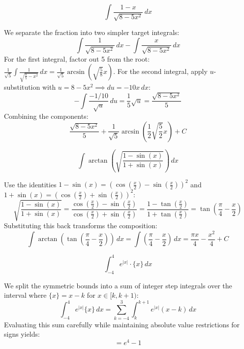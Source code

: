 \begin{questions}
    \question 
    \[ \int \frac{1-x}{\sqrt{8-5x^{2}}} \, dx \]
    \begin{solution}
        We separate the fraction into two simpler target integrals:
        \[ \int \frac{1}{\sqrt{8-5x^2}} \, dx - \int \frac{x}{\sqrt{8-5x^2}} \, dx \]
        For the first integral, factor out 5 from the root: $\frac{1}{\sqrt{5}}\int \frac{1}{\sqrt{\frac{8}{5}-x^2}} \, dx = \frac{1}{\sqrt{5}}\arcsin\left(\sqrt{\frac{5}{8}}x\right)$.
        For the second integral, apply $u$-substitution with $u = 8-5x^2 \implies du = -10x \, dx$:
        \[ -\int \frac{-1/10}{\sqrt{u}} \, du = \frac{1}{5}\sqrt{u} = \frac{\sqrt{8-5x^2}}{5} \]
        Combining the components:
        \[ \frac{\sqrt{8-5x^2}}{5} + \frac{1}{\sqrt{5}}\arcsin\left(\frac{1}{2}\sqrt{\frac{5}{2}}x\right) + C \]
    \end{solution}

    \question 
    \[ \int \arctan\left(\sqrt{\frac{1-\sin(x)}{1+\sin(x)}}\right) \, dx \]
    \begin{solution}
        Use the identities $1-\sin(x) = \left(\cos(\frac{x}{2})-\sin(\frac{x}{2})\right)^2$ and $1+\sin(x) = \left(\cos(\frac{x}{2})+\sin(\frac{x}{2})\right)^2$:
        \[ \sqrt{\frac{1-\sin(x)}{1+\sin(x)}} = \frac{\cos(\frac{x}{2})-\sin(\frac{x}{2})}{\cos(\frac{x}{2})+\sin(\frac{x}{2})} = \frac{1-\tan(\frac{x}{2})}{1+\tan(\frac{x}{2})} = \tan\left(\frac{\pi}{4}-\frac{x}{2}\right) \]
        Substituting this back transforms the composition:
        \[ \int \arctan\left(\tan\left(\frac{\pi}{4}-\frac{x}{2}\right)\right) \, dx = \int \left( \frac{\pi}{4} - \frac{x}{2} \right) \, dx = \frac{\pi x}{4} - \frac{x^2}{4} + C \]
    \end{solution}

    \question 
    \[ \int_{-4}^{4} e^{|x|}\cdot\{x\} \, dx \]
    \begin{solution}
        We split the symmetric bounds into a sum of integer step integrals over the interval where $\{x\} = x - k$ for $x \in [k, k+1)$:
        \[ \int_{-4}^{4} e^{|x|}\{x\} \, dx = \sum_{k=-4}^{3} \int_{k}^{k+1} e^{|x|}(x-k) \, dx \]
        Evaluating this sum carefully while maintaining absolute value restrictions for signs yields:
        \[ = e^4 - 1 \]
    \end{solution}


\end{questions}
